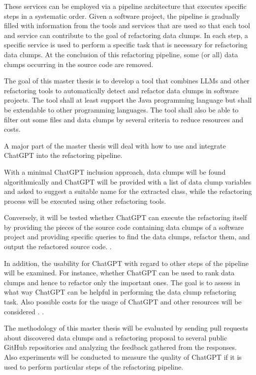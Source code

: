 These services can be employed via a pipeline architecture that executes specific steps in a systematic order.  Given a software project, the pipeline is gradually filled with information from the tools and services that are used so that each tool and service can contribute to the goal of refactoring data clumps.  In each step, a specific service is used to perform a specific task that is necessary for refactoring data clumps. At the conclusion of this refactoring pipeline, some (or all) data clumps occurring in the source code are removed.  




The goal of this master thesis is to develop a tool that combines \acp{LLM} and other refactoring tools to automatically detect and refactor data clumps in software projects. The tool  shall at least support the Java programming language but shall be extendable to  other programming languages. The tool shall also  be able to filter out some files and data clumps by several criteria to reduce resources and costs. 


A major part of the master thesis will deal with how to use and integrate ChatGPT into the refactoring pipeline. 

With a minimal ChatGPT inclusion approach,  data clumps will be found algorithmically  and ChatGPT will be provided with a list of data clump variables and asked to suggest a suitable name for the extracted class, while the refactoring process will be executed using other refactoring tools.


Conversely, it will be tested whether ChatGPT can execute the refactoring itself by providing the pieces of the source code containing data clumps of a software project and providing specific queries to find the data clumps, refactor them, and output the refactored source code. \cite{White2023ChatGPTPP}.

In addition, the usability for ChatGPT with regard to other steps of the pipeline will be examined. For instance, whether ChatGPT can be used to rank data clumps and hence to refactor only the important ones. The goal is to assess in what way ChatGPT can be helpful in performing the data clump refactoring task. Also possible costs for the usage of ChatGPT and other resources will be considered \cite{xia2023conversation}. \cite{4ef0b456377aafb68884e643779dffb36b8e7cc1}.


The methodology of this master thesis will be evaluated by sending  pull requests about discovered data clumps and a refactoring proposal to several public GitHub repositories and analyzing the feedback gathered from the responses. Also experiments will be conducted to measure the quality of ChatGPT if it is used to perform particular steps of the refactoring pipeline.  

